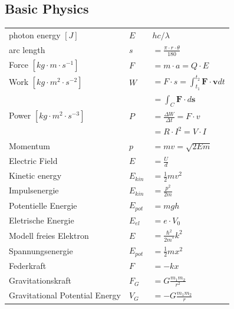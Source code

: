 \documentclass[9pt]{article}
\begin{document}
\begin{multicols}{2}
\subsection{Basic Physics}

	\begin{tabular}{lll}
	photon energy $[J]$									&$E$      &$hc/\lambda$\\
		arc length          										&$s$    &$=\frac{\pi \cdot r\cdot \theta}{180}$\\
		Force $[kg\cdot m \cdot s^{-1}]$                 & $F$       & $=m \cdot a=Q\cdot E$ \\
		Work $[kg\cdot m^2\cdot s^{-2}]$                & $W$       & $=F\cdot s = \int _{t_{1}}^{t_{2}}\mathbf {F} \cdot \mathbf {v} dt$ \\ 
						&		   &$=\int _{C}\mathbf {F} \cdot d\mathbf {s}$                                        \\
		Power $[kg \cdot m^2 \cdot s^{-3}]$               & $P$       & $=\frac{\Delta W}{\Delta t}= F\cdot v$                                       \\
				       &           & $=R\cdot I^2=V\cdot I$                            \\
		Momentum           & $p$               & $=mv=\sqrt{2 E m}$ \\
		Electric Field			&$E$				&$=\frac{U}{d}$\\
		Kinetic energy     & $E_{kin}$ & $=\frac{1}{2}mv^2$                                \\
		Impulsenergie         & $E_{kin}$ & $=\frac{p^2}{2m}$                                 \\
		Potentielle Energie    & $E_{pot}$ & $=mgh$                                            \\
		Eletrische Energie     & $E_{el}$  & $=e\cdot V_0$                                     \\
		Modell freies Elektron & $E$       & $=\frac{\hbar^2}{2m^*}k^2$                        \\
		Spannungsenergie       & $E_{pot}$ & $=\frac{1}{2}mx^2$                                \\
		Federkraft             & $F$       & $=-kx$                                            \\
		Gravitationskraft      & $F_G$     & $=G\frac{m_1m_2}{r^2}$    
		\\
		Gravitational Potential Energy & $V_G$  & $=-G\frac{m_1m_2}{r}$ 
		\\
	\end{tabular}

\end{multicols}
\end{document}
